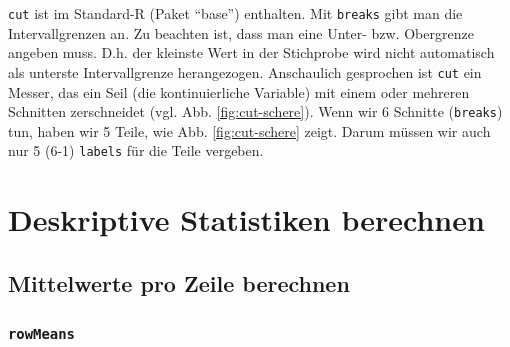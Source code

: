\documentclass[12pt,ngerman,]{book}
\makeatletter
\newenvironment{Shaded}{\begin{snugshade}}{\end{snugshade}}
\newcommand{\KeywordTok}[1]{\textcolor[rgb]{0.13,0.29,0.53}{\textbf{#1}}}
\newcommand{\DataTypeTok}[1]{\textcolor[rgb]{0.13,0.29,0.53}{#1}}
\newcommand{\DecValTok}[1]{\textcolor[rgb]{0.00,0.00,0.81}{#1}}
\newcommand{\StringTok}[1]{\textcolor[rgb]{0.31,0.60,0.02}{#1}}
\newcommand{\CommentTok}[1]{\textcolor[rgb]{0.56,0.35,0.01}{\textit{#1}}}
\newcommand{\OtherTok}[1]{\textcolor[rgb]{0.56,0.35,0.01}{#1}}
\newcommand{\OperatorTok}[1]{\textcolor[rgb]{0.81,0.36,0.00}{\textbf{#1}}}
\newcommand{\NormalTok}[1]{#1}
\newenvironment{kframe}{%
\medskip{}
\setlength{\fboxsep}{.8em}
 \def\at@end@of@kframe{}%
 \ifinner\ifhmode%
  \def\at@end@of@kframe{\end{minipage}}%
  \begin{minipage}{\columnwidth}%
 \fi\fi%
 \def\FrameCommand##1{\hskip\@totalleftmargin \hskip-\fboxsep
 \colorbox{shadecolor}{##1}\hskip-\fboxsep
     \hskip-\linewidth \hskip-\@totalleftmargin \hskip\columnwidth}%
 \MakeFramed {\advance\hsize-\width
   \@totalleftmargin\z@ \linewidth\hsize
   \@setminipage}}%
 {\par\unskip\endMakeFramed%
 \at@end@of@kframe}
\renewenvironment{Shaded}{\begin{kframe}}{\end{kframe}}
\theoremstyle{definition}
\theoremstyle{definition}
\theoremstyle{remark}
\makeatother
\begin{document}
\begin{Shaded}
\end{Shaded}

\texttt{cut} ist im Standard-R (Paket ``base'') enthalten. Mit
\texttt{breaks} gibt man die Intervallgrenzen an. Zu beachten ist, dass
man eine Unter- bzw. Obergrenze angeben muss. D.h. der kleinste Wert in
der Stichprobe wird nicht automatisch als unterste Intervallgrenze
herangezogen. Anschaulich gesprochen ist \texttt{cut} ein Messer, das
ein Seil (die kontinuierliche Variable) mit einem oder mehreren
Schnitten zerschneidet (vgl. Abb. \ref{fig:cut-schere}). Wenn wir 6
Schnitte (\texttt{breaks}) tun, haben wir 5 Teile, wie Abb.
\ref{fig:cut-schere} zeigt. Darum müssen wir auch nur 5 (6-1)
\texttt{labels} für die Teile vergeben.

\section{Deskriptive Statistiken
berechnen}\label{deskriptive-statistiken-berechnen}

\subsection{Mittelwerte pro Zeile
berechnen}\label{mittelwerte-pro-zeile-berechnen}

\subsubsection{\texorpdfstring{\texttt{rowMeans}}{rowMeans}}\label{rowmeans}
\end{document}
